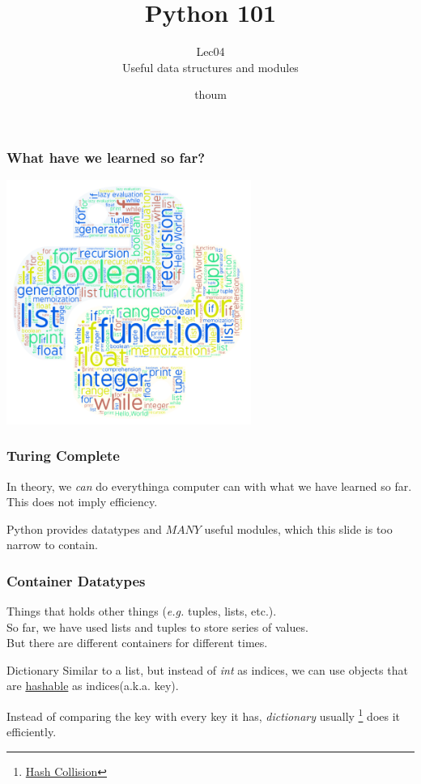 \documentclass{beamer}
\title{Python 101}
\subtitle{Lec04 \\ Useful data structures and modules}
\author{thoum}
\begin{document}
\frame{\titlepage}

\begin{frame}
\frametitle{What have we learned so far?}
  \begin{center}
  \includegraphics[width=80mm]{../lec04/python_art.png}
  \end{center}
\end{frame}

\begin{frame}
\frametitle{Turing Complete}
  In theory, we \textit{can} do everything\tiny{a computer can} \normalsize with what we have learned so far.
  This does not imply efficiency.
  
\end{frame}

\begin{frame}
  Python provides datatypes and $MANY$ useful modules, which this slide is too narrow to contain.
\end{frame}

\begin{frame}
\frametitle{Container Datatypes}
  Things that holds other things (\textit{e.g.} tuples, lists, etc.).\\
  \bigskip
  So far, we have used lists and tuples to store series of values.\\
  But there are different containers for different times.
\end{frame}

\begin{frame}{Dictionary}
  Similar to a list, but instead of \textit{int} as indices, we can use
  objects that are 
  \href{https://docs.python.org/3.7/glossary.html\#term-hashable}{hashable}
  as indices(a.k.a. key).

  Instead of comparing the key with every key it has, \textit{dictionary}
  usually
  \footnote{\href{https://en.wikipedia.org/wiki/Collision_(computer_science)}{Hash
  Collision}} does it efficiently.
\end{frame}
\end{document}
